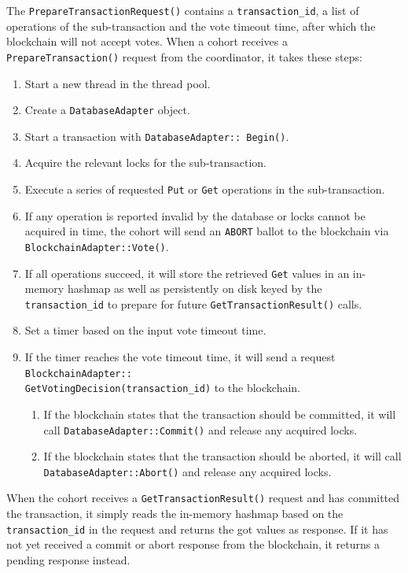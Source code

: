 \documentclass[11pt,conference]{IEEEtran}
\begin{document}
The \texttt{PrepareTransactionRequest()} contains a \texttt{transaction\_id}, a list of operations of the sub-transaction and the vote timeout time, after which the blockchain will not accept votes. When a cohort receives a \texttt{PrepareTransaction()} request from the coordinator, it takes these steps: 
\begin{enumerate}
  \item Start a new thread in the thread pool.
  \item Create a \texttt{DatabaseAdapter} object.
  \item Start a transaction with \texttt{DatabaseAdapter:: Begin()}.
  \item Acquire the relevant locks for the sub-transaction.
  \item Execute a series of requested \texttt{Put} or \texttt{Get} operations in the sub-transaction. 
  \item If any operation is reported invalid by the database or locks cannot be acquired in time, the cohort will send an \texttt{ABORT} ballot to the blockchain via \texttt{BlockchainAdapter::Vote()}.
  \item If all operations succeed, it will store the retrieved \texttt{Get} values in an in-memory hashmap as well as persistently on disk keyed by the \texttt{transaction\_id} to prepare for future \texttt{GetTransactionResult()} calls.
  \item Set a timer based on the input vote timeout time.
  \item If the timer reaches the vote timeout time, it will send a request \texttt{BlockchainAdapter::\\GetVotingDecision(transaction\_id)} to the blockchain. 
    \begin{enumerate}
      \item If the blockchain states that the transaction should be committed, it will call \texttt{DatabaseAdapter::Commit()} and release any acquired locks.
  \item If the blockchain states that the transaction should be aborted, it will call \texttt{DatabaseAdapter::Abort()} and release any acquired locks.
  \end{enumerate}
\end{enumerate}

When the cohort receives a \texttt{GetTransactionResult()} request and has committed the transaction, it simply reads the in-memory hashmap based on the \texttt{transaction\_id} in the request and returns the got values as response. If it has not yet received a commit or abort response from the blockchain, it returns a pending response instead.
\end{document}
